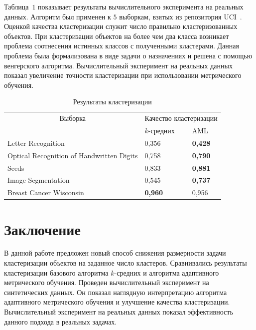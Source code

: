 \documentclass[12pt,twoside]{article}
\begin{document}
Таблица~$1$ показывает результаты вычислительного эксперимента на реальных
данных.
Алгоритм был применен к $5$ выборкам, взятых из репозитория UCI~\cite{letterrecognition, opt_digits, seeds, image, breast}.
Оценкой качества кластеризации служит число правильно кластеризованных объектов.
При клас\-те\-ри\-за\-ции объектов на более чем два класса возникает проблема соотнесения истинных классов с полученными кластерами.
Данная проблема была формализована в виде задачи о назначениях и решена с помощью венгерского алгоритма. Вычислительный эксперимент на реальных данных показал увеличение точности кластеризации при использовании метрического обучения.
\begin{table} %
\centering
\caption{Результаты кластеризации}
\label{my-label}

\vspace{2ex}

\begin{tabular}{|l|l|l|}
\hline
\multicolumn{1}{|c}{Выборка}                  & \multicolumn{2}{c|}{Качество кластеризации} \\ \cline{2-3}
                                          & $k$-средних               & AML                 \\
\hline
Letter Recognition                        & 0,356                 & \textbf{0,428}             \\
Optical Recognition of Handwritten Digits & 0,758                 & \textbf{0,790}               \\
Seeds                                     & 0,833                 & \textbf{0,881}            \\
Image Segmentation                        & 0,545                 & \textbf{0,737}            \\
Breast Cancer Wisconsin                   & \textbf{0,960}                 & 0,956               \\ \hline
\end{tabular}
\end{table}

\section{Заключение}
В данной работе предложен новый способ снижения размерности задачи кластеризации объектов на заданное число кластеров.
Сравнивались результаты кластеризации базового алгоритма $k$-средних и алгоритма адаптивного метрического обучения. Проведен вычислительный эксперимент на синтетических данных.
Он показал наглядную интерпретацию алгоритма адаптивного метрического обучения и улучшение качества кластеризации. Вычислительный эксперимент на реальных данных показал эффективность данного подхода в реальных задачах.
\end{document}
